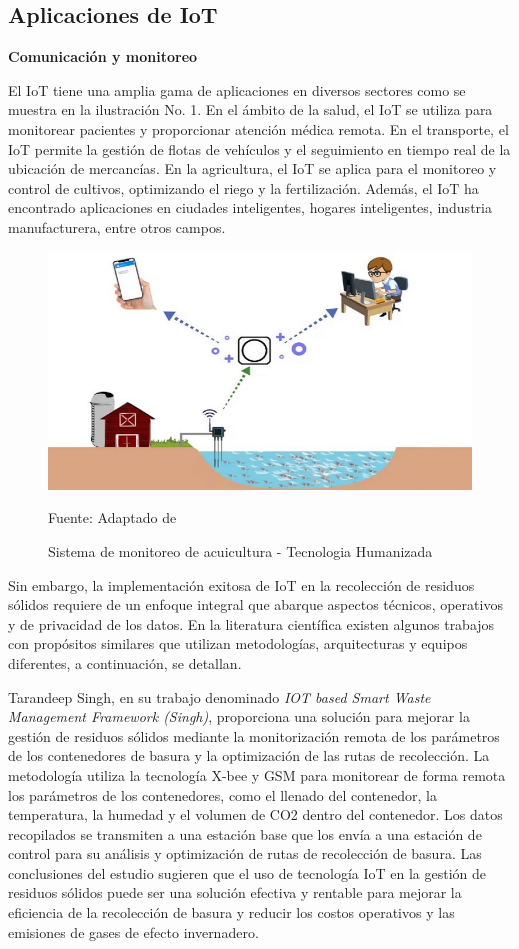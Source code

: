 \subsection{Aplicaciones de IoT}

\textbf{Comunicación y monitoreo}

El IoT tiene una amplia gama de aplicaciones en diversos sectores como se muestra en la ilustración No. 1. En el ámbito de la salud, el IoT se utiliza para monitorear pacientes y proporcionar atención médica remota. En el transporte, el IoT permite la gestión de flotas de vehículos y el seguimiento en tiempo real de la ubicación de mercancías. En la agricultura, el IoT se aplica para el monitoreo y control de cultivos, optimizando el riego y la fertilización. Además, el IoT ha encontrado aplicaciones en ciudades inteligentes, hogares inteligentes, industria manufacturera, entre otros campos.

\begin{figure}[htb]
	\centering
	\includegraphics[scale  = 0.80]{Imagenes/iot.jpg}
	\caption{Sistema de monitoreo de acuicultura - Tecnologia Humanizada}{Fuente: Adaptado de~\cite{udin}}
\end{figure}

Sin embargo, la implementación exitosa de IoT en la recolección de residuos sólidos requiere de un enfoque integral que abarque aspectos técnicos, operativos y de privacidad de los datos. En la literatura científica existen algunos trabajos con propósitos similares que utilizan metodologías, arquitecturas y equipos diferentes, a continuación, se detallan.

Tarandeep Singh, en su trabajo denominado \textit{IOT based Smart Waste Management Framework (Singh)}, proporciona una solución para mejorar la gestión de residuos sólidos mediante la monitorización remota de los parámetros de los contenedores de basura y la optimización de las rutas de recolección. La metodología utiliza la tecnología X-bee y GSM para monitorear de forma remota los parámetros de los contenedores, como el llenado del contenedor, la temperatura, la humedad y el volumen de CO2 dentro del contenedor. Los datos recopilados se transmiten a una estación base que los envía a una estación de control para su análisis y optimización de rutas de recolección de basura. Las conclusiones del estudio sugieren que el uso de tecnología IoT en la gestión de residuos sólidos puede ser una solución efectiva y rentable para mejorar la eficiencia de la recolección de basura y reducir los costos operativos y las emisiones de gases de efecto invernadero.

